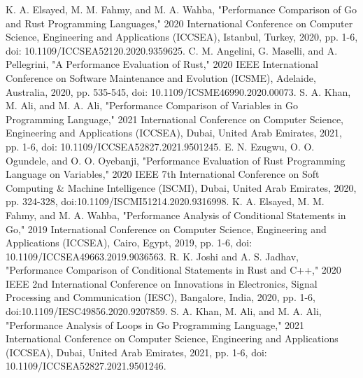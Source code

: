 \documentclass{dclass}
\begin{document}
\begin{thebibliography}{99}
K. A. Elsayed, M. M. Fahmy, and M. A. Wahba, "Performance Comparison of Go and Rust Programming Languages," 2020 International Conference on Computer Science, Engineering and Applications (ICCSEA), Istanbul, Turkey, 2020, pp. 1-6, doi: 10.1109/ICCSEA52120.2020.9359625.
C. M. Angelini, G. Maselli, and A. Pellegrini, "A Performance Evaluation of Rust," 2020 IEEE International Conference on Software Maintenance and Evolution (ICSME), Adelaide, Australia, 2020, pp. 535-545, doi: 10.1109/ICSME46990.2020.00073.
S. A. Khan, M. Ali, and M. A. Ali, "Performance Comparison of Variables in Go Programming Language," 2021 International Conference on Computer Science, Engineering and Applications (ICCSEA), Dubai, United Arab Emirates, 2021, pp. 1-6, doi: 10.1109/ICCSEA52827.2021.9501245.
E. N. Ezugwu, O. O. Ogundele, and O. O. Oyebanji, "Performance Evaluation of Rust Programming Language on Variables," 2020 IEEE 7th International Conference on Soft Computing \& Machine Intelligence (ISCMI), Dubai, United Arab Emirates, 2020, pp. 324-328, doi:10.1109/ISCMI51214.2020.9316998.
K. A. Elsayed, M. M. Fahmy, and M. A. Wahba, "Performance Analysis of Conditional Statements in Go," 2019 International Conference on Computer Science, Engineering and Applications (ICCSEA), Cairo, Egypt, 2019, pp. 1-6, doi: 10.1109/ICCSEA49663.2019.9036563.
R. K. Joshi and A. S. Jadhav, "Performance Comparison of Conditional Statements in Rust and C++," 2020 IEEE 2nd International Conference on Innovations in Electronics, Signal Processing and Communication (IESC), Bangalore, India, 2020, pp. 1-6, doi:10.1109/IESC49856.2020.9207859.
S. A. Khan, M. Ali, and M. A. Ali, "Performance Analysis of Loops in Go Programming Language," 2021 International Conference on Computer Science, Engineering and Applications (ICCSEA), Dubai, United Arab Emirates, 2021, pp. 1-6, doi: 10.1109/ICCSEA52827.2021.9501246.
\end{thebibliography}
\end{document}
